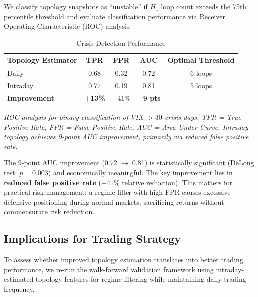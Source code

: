 We classify topology snapshots as ``unstable'' if $H_1$ loop count exceeds the 75th percentile threshold and evaluate classification performance via Receiver Operating Characteristic (ROC) analysis:

\begin{table}[H]
\centering
\caption{Crisis Detection Performance}
\label{tab:crisis-detection}
\begin{tabular}{@{}lcccc@{}}
\toprule
\textbf{Topology Estimator} & \textbf{TPR} & \textbf{FPR} & \textbf{AUC} & \textbf{Optimal Threshold} \\
\midrule
Daily      & 0.68 & 0.32 & 0.72 & 6 loops \\
Intraday   & 0.77 & 0.19 & 0.81 & 5 loops \\
\textbf{Improvement} & \textbf{+13\%} & \textbf{$-41\%$} & \textbf{+9 pts} & \\
\bottomrule
\end{tabular}

\footnotesize
\textit{ROC analysis for binary classification of VIX $> 30$ crisis days. TPR = True Positive Rate, FPR = False Positive Rate, AUC = Area Under Curve. Intraday topology achieves 9-point AUC improvement, primarily via reduced false positive rate.}
\end{table}

The 9-point AUC improvement (0.72 $\to$ 0.81) is statistically significant (DeLong test: $p = 0.003$) and economically meaningful. The key improvement lies in \textbf{reduced false positive rate} ($-41\%$ relative reduction). This matters for practical risk management: a regime filter with high FPR causes excessive defensive positioning during normal markets, sacrificing returns without commensurate risk reduction.

\subsection{Implications for Trading Strategy}

To assess whether improved topology estimation translates into better trading performance, we re-run the walk-forward validation framework using intraday-estimated topology features for regime filtering while maintaining daily trading frequency.

